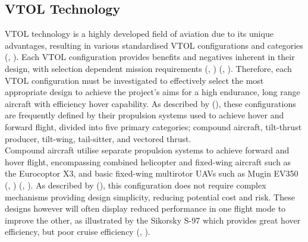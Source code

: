 \subsection{VTOL Technology}

VTOL technology is a highly developed field of aviation due to its unique advantages, resulting in various standardised VTOL configurations and categories (\citeauthor{RN15}, \citeyear{RN15}). Each VTOL configuration provides benefits and negatives inherent in their design, with selection dependent mission requirements (\citeauthor{hirschberg2006overview}, \citeyear{hirschberg2006overview}) (\citeauthor{RN15}, \citeyear{RN15}). Therefore, each VTOL configuration must be investigated to effectively select the most appropriate design to achieve the project’s aims for a high endurance, long range aircraft with efficiency hover capability. As described by \citeauthor{hirschberg2006overview} (\citeyear{hirschberg2006overview}), these configurations are frequently defined by their propulsion systems used to achieve hover and forward flight, divided into five primary categories; compound aircraft, tilt-thrust producer, tilt-wing, tail-sitter, and vectored thrust. \\

Compound aircraft utilise separate propulsion systems to achieve forward and hover flight, encompassing combined helicopter and fixed-wing aircraft such as the Eurocoptor X3, and basic fixed-wing multirotor UAVs such as Mugin EV350 (\citeauthor{RN15}, \citeyear{RN15}) (\citeauthor{Mugin}, \citeyear{Mugin}). As described by \citeauthor{dundar2020design} (\citeyear{dundar2020design}), this configuration does not require complex mechanisms providing design simplicity, reducing potential cost and risk. These designs however will often display reduced performance in one flight mode to improve the other, as illustrated by the Sikorsky S-97 which provides great hover efficiency, but poor cruise efficiency (\citeauthor{RN15}, \citeyear{RN15}). \\

